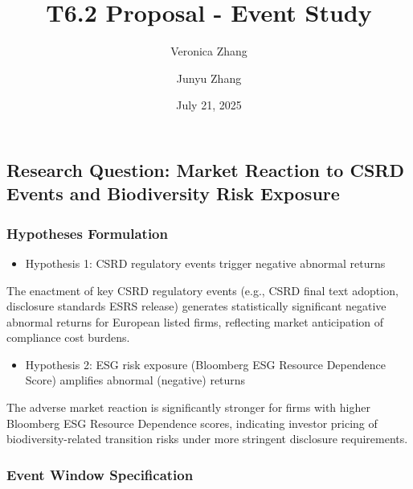 \documentclass[
  letterpaper,
  DIV=11,
  numbers=noendperiod]{scrartcl}
\title{T6.2 Proposal - Event Study}
\author{Veronica Zhang \and Junyu Zhang}
\date{July 21, 2025}
\providecommand{\tightlist}{%
  \setlength{\itemsep}{0pt}\setlength{\parskip}{0pt}}
\begin{document}
\maketitle


\subsection{Research Question: Market Reaction to CSRD Events and
Biodiversity Risk
Exposure}\label{research-question-market-reaction-to-csrd-events-and-biodiversity-risk-exposure}

\subsubsection{Hypotheses Formulation}\label{hypotheses-formulation}

\begin{itemize}
\tightlist
\item
  Hypothesis 1: CSRD regulatory events trigger negative abnormal returns
\end{itemize}

The enactment of key CSRD regulatory events (e.g., CSRD final text
adoption, disclosure standards ESRS release) generates statistically
significant negative abnormal returns for European listed firms,
reflecting market anticipation of compliance cost burdens.

\begin{itemize}
\tightlist
\item
  Hypothesis 2: ESG risk exposure (Bloomberg ESG Resource Dependence
  Score) amplifies abnormal (negative) returns
\end{itemize}

The adverse market reaction is significantly stronger for firms with
higher Bloomberg ESG Resource Dependence scores, indicating investor
pricing of biodiversity-related transition risks under more stringent
disclosure requirements.

\subsubsection{Event Window
Specification}\label{event-window-specification}
\end{document}
